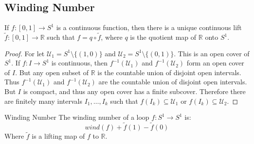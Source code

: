     \subsection{Winding Number}
        \begin{theorem}
            If $f:[0,1]\rightarrow{S}^{1}$ is a continuous
            function, then there is a unique continuous lift
            $\tilde{f}:[0,1]\rightarrow\mathbb{R}$ such that
            $f=q\circ\tilde{f}$, where $q$ is the quotient map
            of $\mathbb{R}$ onto $S^{1}$.
        \end{theorem}
        \begin{proof}
            For let $\mathcal{U}_{1}=S^{1}\setminus\{(1,0)\}$ and
            $\mathcal{U}_{2}=S^{1}\setminus\{(0,1)\}$. This is an
            open cover of $S^{1}$. If $f:I\rightarrow{S}^{1}$ is
            continuous, then $f^{-1}(\mathcal{U}_{1})$ and
            $f^{-1}(\mathcal{U}_{2})$ form an open cover of
            $I$. But any open subset of $\mathbb{R}$ is the
            countable union of disjoint open intervals. Thus
            $f^{-1}(\mathcal{U}_{1})$ and
            $f^{-1}(\mathcal{U}_{2})$ are the countable union of
            disjoint open intervals. But $I$ is compact, and
            thus any open cover has a finite subcover. Therefore
            there are finitely many intervals $I_{1},\dots,I_{k}$
            such that $f(I_{k})\subseteq\mathcal{U}_{1}$ or
            $f(I_{k})\subseteq\mathcal{U}_{2}$.
        \end{proof}
        \begin{ldefinition}{Winding Number}
            The winding number of a loop
            $f:S^{1}\rightarrow{S}^{1}$ is:
            \begin{equation}
                wind(f)+\tilde{f}(1)-\tilde{f}(0)
            \end{equation}
            Where $\tilde{f}$ is a lifting map of $f$ to
            $\mathbb{R}$.
        \end{ldefinition}
